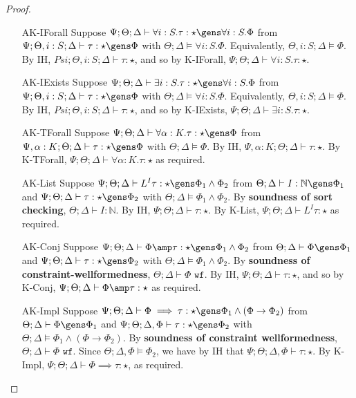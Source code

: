 \begin{proof}
\begin{itemize}
  \item[AK-IForall] Suppose $\Psi ; \Theta ; \Delta \vdash \forall i : S. \tau : \star \gens \forall i : S. \Phi$ from $\Psi ; \Theta, i : S ; \Delta \vdash \tau : \star \gens \Phi$ with $\Theta ; \Delta \vDash \forall i : S. \Phi$. Equivalently, $\Theta, i : S ; \Delta \vDash \Phi$. By IH, $Psi ; \Theta, i : S ; \Delta \vdash \tau : \star$, and so by K-IForall, $\Psi ; \Theta ; \Delta \vdash \forall i : S. \tau : \star$.
  \item[AK-IExists] Suppose $\Psi ; \Theta ; \Delta \vdash \exists i : S. \tau : \star \gens \forall i : S. \Phi$ from $\Psi ; \Theta, i : S ; \Delta \vdash \tau : \star \gens \Phi$ with $\Theta ; \Delta \vDash \forall i : S. \Phi$. Equivalently, $\Theta, i : S ; \Delta \vDash \Phi$. By IH, $Psi ; \Theta, i : S ; \Delta \vdash \tau : \star$, and so by K-IExists, $\Psi ; \Theta ; \Delta \vdash \exists i : S. \tau : \star$.
  \item[AK-TForall] Suppose $\Psi ; \Theta ; \Delta \vdash \forall \alpha : K. \tau : \star \gens \Phi$ from $\Psi, \alpha : K ; \Theta ; \Delta \vdash \tau : \star \gens \Phi$ with $\Theta ; \Delta \vDash \Phi$. By IH, $\Psi, \alpha : K ; \Theta ; \Delta \vdash \tau : \star$. By K-TForall, $\Psi ; \Theta ; \Delta \vdash \forall \alpha : K. \tau : \star$ as required.
  \item[AK-List] Suppose $\Psi ; \Theta ; \Delta \vdash L^I \tau : \star \gens \Phi_1 \wedge \Phi_2$ from $\Theta ; \Delta \vdash I : \mathbb{N} \gens \Phi_1$ and $\Psi ; \Theta ; \Delta \vdash \tau : \star \gens \Phi_2$ with $\Theta ; \Delta \vDash \Phi_1 \wedge \Phi_2$. By \textbf{soundness of sort checking}, $\Theta ; \Delta \vdash I : \mathbb{N}$. By IH, $\Psi ; \Theta ; \Delta \vdash \tau : \star$. By K-List, $\Psi ; \Theta ; \Delta \vdash L^I \tau : \star$ as required.
  \item[AK-Conj] Suppose $\Psi ; \Theta ; \Delta \vdash \Phi \amp \tau : \star \gens \Phi_1 \wedge \Phi_2$ from $\Theta ; \Delta \vdash \Phi \gens \Phi_1$ and $\Psi ; \Theta ; \Delta \vdash \tau : \star \gens \Phi_2$ with $\Theta ; \Delta \vDash \Phi_1 \wedge \Phi_2$. By \textbf{soundness of constraint-wellformedness}, $\Theta ; \Delta \vdash \Phi \texttt{ wf}$. By IH, $\Psi ; \Theta ; \Delta \vdash \tau : \star$, and so by K-Conj, $\Psi ; \Theta ; \Delta \vdash \Phi \amp \tau : \star$ as required.
  \item[AK-Impl] Suppose $\Psi ; \Theta ; \Delta \vdash \Phi \implies \tau : \star \gens \Phi_1 \wedge (\Phi \to \Phi_2)$ from $\Theta ; \Delta \vdash \Phi \gens \Phi_1$ and $\Psi ; \Theta ; \Delta, \Phi \vdash \tau : \star \gens \Phi_2$ with $\Theta ; \Delta \vDash \Phi_1 \wedge (\Phi \to \Phi_2)$. By \textbf{soundness of constraint wellformedness}, $\Theta ; \Delta \vdash \Phi \texttt{ wf}$. Since $\Theta ; \Delta, \Phi \vDash \Phi_2$, we have by IH that $\Psi ; \Theta ; \Delta, \Phi \vdash \tau : \star$. By K-Impl, $\Psi ; \Theta ; \Delta \vdash \Phi \implies \tau : \star$, as required.

\end{itemize}
\end{proof}
